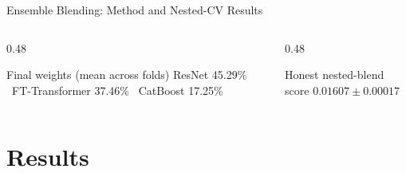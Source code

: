 \documentclass[9pt,aspectratio=169]{beamer}
\begin{document}
\begin{frame}{Ensemble Blending: Method and Nested-CV Results}
\begin{columns}[T]
    \begin{column}{0.48\textwidth}
      \begin{block}{Final weights (mean across folds)}
        \small
        ResNet 45.29\% \textbar\ FT-Transformer 37.46\% \textbar\ CatBoost 17.25\%
      \end{block}
    \end{column}
    \begin{column}{0.48\textwidth}
      \begin{exampleblock}{Honest nested-blend score}
        \small $0.01607 \pm 0.00017$
      \end{exampleblock}
    \end{column}
  \end{columns}
\end{frame}

\section{Results}
\end{document}
